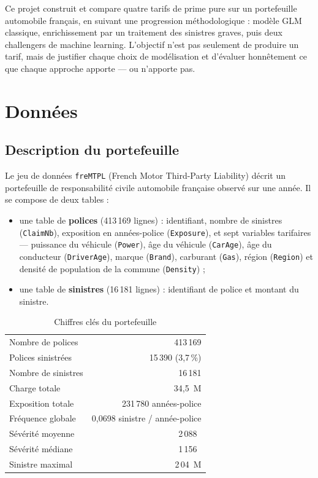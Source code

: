 \documentclass[11pt,a4paper]{article}
\newcommand{\eur}{\texteuro}
\begin{document}
Ce projet construit et compare quatre tarifs de prime pure sur un portefeuille automobile français, en suivant une progression méthodologique : modèle GLM classique, enrichissement par un traitement des sinistres graves, puis deux challengers de machine learning. L'objectif n'est pas seulement de produire un tarif, mais de justifier chaque choix de modélisation et d'évaluer honnêtement ce que chaque approche apporte --- ou n'apporte pas.

\section{Données}

\subsection{Description du portefeuille}

Le jeu de données \texttt{freMTPL} (French Motor Third-Party Liability) décrit un portefeuille de responsabilité civile automobile française observé sur une année. Il se compose de deux tables :

\begin{itemize}
    \item une table de \textbf{polices} (413\,169 lignes) : identifiant, nombre de sinistres (\texttt{ClaimNb}), exposition en années-police (\texttt{Exposure}), et sept variables tarifaires --- puissance du véhicule (\texttt{Power}), âge du véhicule (\texttt{CarAge}), âge du conducteur (\texttt{DriverAge}), marque (\texttt{Brand}), carburant (\texttt{Gas}), région (\texttt{Region}) et densité de population de la commune (\texttt{Density}) ;
    \item une table de \textbf{sinistres} (16\,181 lignes) : identifiant de police et montant du sinistre.
\end{itemize}

\begin{table}[H]
\centering
\caption{Chiffres clés du portefeuille}
\begin{tabular}{lr}
\toprule
Nombre de polices & 413\,169 \\
Polices sinistrées & 15\,390 (3{,}7\,\%) \\
Nombre de sinistres & 16\,181 \\
Charge totale & 34{,}5~M\eur \\
Exposition totale & 231\,780 années-police \\
Fréquence globale & 0{,}0698 sinistre / année-police \\
Sévérité moyenne & 2\,088~\eur \\
Sévérité médiane & 1\,156~\eur \\
Sinistre maximal & 2\,04~M\eur \\
\bottomrule
\end{tabular}
\end{table}
\end{document}
